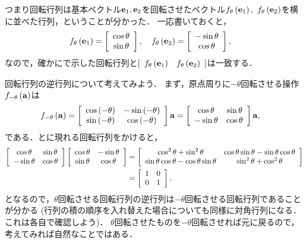 つまり回転行列は基本ベクトル${\bf e}_{1},{\bf e}_{2}$を回転させたベクトル$f_{\theta}\left({\bf e}_{1}\right),~f_{\theta}\left({\bf e}_{2}\right)$を横に並べた行列，ということが分かった．
一応書いておくと，
\begin{align}
f_{\theta}\left({\bf e}_{1}\right) & =\left[\begin{array}{c}
\cos\theta\\
\sin\theta
\end{array}\right],\quad f_{\theta}\left({\bf e}_{2}\right)=\left[\begin{array}{c}
-\sin\theta\\
\cos\theta
\end{array}\right], 
\end{align}
%
なので，確かにで示した回転行列と$[\begin{array}{cc} f_{\theta}\left({\bf e}_{1}\right) & f_{\theta}\left({\bf e}_{2}\right)\end{array}]$は一致する．

回転行列の逆行列について考えてみよう．
まず，原点周りに$-\theta$回転させる操作$f_{-\theta}\left({\bf a}\right)$は
\begin{align}
f_{-\theta}\left({\bf a}\right) & =\left[\begin{array}{cc}
\cos\left(-\theta\right) & -\sin\left(-\theta\right)\\
\sin\left(-\theta\right) & \cos\left(-\theta\right)
\end{array}\right]{\bf a}=\left[\begin{array}{cc}
\cos\theta & \sin\theta\\
-\sin\theta & \cos\theta
\end{array}\right]{\bf a}, \label{LA:f-theta}
\end{align}
%
である．とに現れる回転行列をかけると，
\begin{align}
\left[\begin{array}{cc}
\cos\theta & \sin\theta\\
-\sin\theta & \cos\theta
\end{array}\right] 
\left[\begin{array}{cc}
\cos\theta & -\sin\theta\\
\sin\theta & \cos\theta
\end{array}\right]
& =\left[\begin{array}{cc}
\cos^{2}\theta+\sin^{2}\theta & \cos\theta\sin\theta-\sin\theta\cos\theta\\
\sin\theta\cos\theta-\cos\theta\sin\theta & \sin^{2}\theta+\cos^{2}\theta
\end{array}\right]\notag\\
 & =\left[\begin{array}{cc}
1 & 0\\
0 & 1
\end{array}\right],
\end{align}
となるので，$\theta$回転させる回転行列の逆行列は$-\theta$回転させる回転行列であることが分かる (行列の積の順序を入れ替えた場合についても同様に対角行列になる．これは各自で確認しよう)．
$\theta$回転させたものを$-\theta$回転させれば元に戻るので，考えてみれば自然なことではある．

